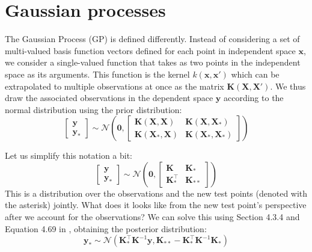 \documentclass{article}
\begin{document}
\section{Gaussian processes}

The Gaussian Process (GP) is defined differently. Instead of considering a set of multi-valued basis function vectors defined for each point in independent space $\mathbf{x}$, we consider a single-valued function that takes as two points in the independent space as its arguments. This function is the kernel $k(\mathbf{x},\mathbf{x}')$ which can be extrapolated to multiple observations at once as the matrix $\mathbf{K}(\mathbf{X},\mathbf{X}')$. We thus draw the associated observations in the dependent space $\mathbf{y}$ according to the normal distribution using the prior distribution:
\begin{equation}
    \begin{bmatrix}
    \mathbf{y} \\
    \mathbf{y_\ast}
    \end{bmatrix} \sim
    \mathcal{N}\left(\mathbf{0},
    \begin{bmatrix}
    \mathbf{K}(\mathbf{X},\mathbf{X}) & \mathbf{K}(\mathbf{X},\mathbf{X}_\ast) \\
    \mathbf{K}(\mathbf{X}_\ast,\mathbf{X}) & \mathbf{K}(\mathbf{X}_\ast,\mathbf{X}_\ast)
    \end{bmatrix}\right)
\end{equation} 

Let us simplify this notation a bit:
\begin{equation}
    \begin{bmatrix}
    \mathbf{y} \\
    \mathbf{y_\ast}
    \end{bmatrix} \sim
    \mathcal{N}\left(\mathbf{0},
    \begin{bmatrix}
    \mathbf{K} & \mathbf{K}_\ast \\
    \mathbf{K}^\top_\ast & \mathbf{K}_{\ast\ast}
    \end{bmatrix}\right)
\end{equation} 
This is a distribution over the observations and the new test points (denoted with the asterisk) jointly. What does it looks like from the new test point's perspective after we account for the observations?  We can solve this using Section 4.3.4 and Equation 4.69 in \cite{murphy}, obtaining the posterior distribution:
\begin{equation}
\label{GP_posterior}
\mathbf{y}_\ast\sim\mathcal{N}\left(\mathbf{K}_\ast^\top \mathbf{K}^{-1}\mathbf{y},\mathbf{K}_{\ast\ast}-\mathbf{K}_\ast^\top \mathbf{K}^{-1}\mathbf{K}_\ast \right)
\end{equation}
\end{document}
